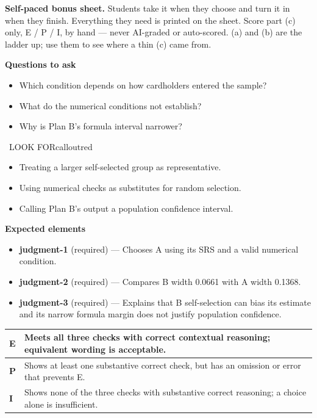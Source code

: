 \documentclass[11pt]{article}
\begin{document}
\textbf{Self-paced bonus sheet.} Students take it when they choose and turn it in when they finish. Everything they need is printed on the sheet. Score part (c) only, E / P / I, by hand --- never AI-graded or auto-scored. (a) and (b) are the ladder up; use them to see where a thin (c) came from.\par

\textbf{Questions to ask}
\begin{itemize}[leftmargin=1.5em,itemsep=2pt,topsep=2pt]
  \item Which condition depends on how cardholders entered the sample?
  \item What do the numerical conditions not establish?
  \item Why is Plan B's formula interval narrower?
\end{itemize}

\begin{callout}{\IconWarn\ LOOK FOR}{calloutred}
\begin{itemize}[leftmargin=1.5em,itemsep=2pt,topsep=2pt]
  \item Treating a larger self-selected group as representative.
  \item Using numerical checks as substitutes for random selection.
  \item Calling Plan B's output a population confidence interval.
\end{itemize}
\end{callout}


\textbf{Expected elements}
\begin{itemize}[leftmargin=1.5em,itemsep=2pt,topsep=2pt]
  \item \textbf{judgment-1} (required) --- Chooses A using its SRS and a valid numerical condition.
  \item \textbf{judgment-2} (required) --- Compares B width 0.0661 with A width 0.1368.
  \item \textbf{judgment-3} (required) --- Explains that B self-selection can bias its estimate and its narrow formula margin does not justify population confidence.
\end{itemize}

{\small\renewcommand{\arraystretch}{1.25}
\noindent\begin{tabular}{|p{0.5in}|p{5.9in}|}
\hline
\textbf{E} & Meets all three checks with correct contextual reasoning; equivalent wording is acceptable. \\ \hline
\textbf{P} & Shows at least one substantive correct check, but has an omission or error that prevents E. \\ \hline
\textbf{I} & Shows none of the three checks with substantive correct reasoning; a choice alone is insufficient. \\ \hline
\end{tabular}}
\end{document}
